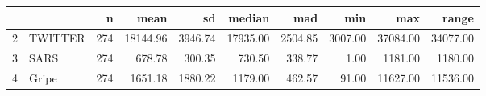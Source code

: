 \begin{table}[ht]
\centering
\begin{tabular}{rlrrrrrrrr}
  \hline
 &   & n & mean & sd & median & mad & min & max & range \\ 
  \hline
2 & TWITTER & 274 & 18144.96 & 3946.74 & 17935.00 & 2504.85 & 3007.00 & 37084.00 & 34077.00 \\ 
  3 & SARS & 274 & 678.78 & 300.35 & 730.50 & 338.77 & 1.00 & 1181.00 & 1180.00 \\ 
  4 & Gripe & 274 & 1651.18 & 1880.22 & 1179.00 & 462.57 & 91.00 & 11627.00 & 11536.00 \\ 
   \hline
\end{tabular}
\end{table}
